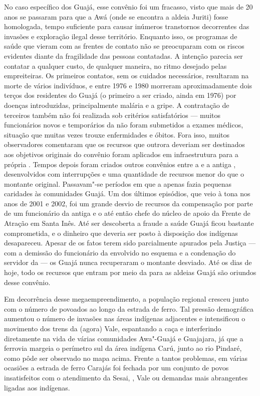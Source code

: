 No caso específico dos Guajá, esse convênio foi um fracasso, visto que
mais de 20 anos se passaram para que a  Awá (onde se encontra a aldeia
Juriti) fosse homologada, tempo suficiente para causar inúmeros
transtornos decorrentes das invasões e exploração ilegal desse
território. Enquanto isso, os programas de saúde que vieram com as
frentes de contato não se preocuparam com os riscos evidentes diante da
fragilidade das pessoas contatadas. A intenção parecia ser contatar a
qualquer custo, de qualquer maneira, no ritmo desejado pelas
empreiteiras. Os primeiros contatos, sem os cuidados necessários,
resultaram na morte de vários indivíduos, e entre 1976 e 1980 morreram
aproximadamente dois terços dos residentes do  Guajá (o primeiro a
ser criado, ainda em 1976) por doenças introduzidas, principalmente
malária e a gripe. A contratação de terceiros também não foi realizada
sob critérios satisfatórios --- muitos funcionários novos e temporários da
 não foram submetidos a exames médicos, situação que muitas vezes
trouxe enfermidades e óbitos. Fora isso, muitos observadores comentaram
que os recursos que outrora deveriam ser destinados aos objetivos
originais do convênio foram aplicados em infraestrutura para a própria
. Tempos depois foram criados outros convênios entre a  e a
antiga , desenvolvidos com interrupções e uma quantidade de recursos
menor do que o montante original. Passavam"-se períodos em que a 
apenas fazia pequenas caridades às comunidades Guajá. Um dos últimos
episódios, que veio à tona nos anos de 2001 e 2002, foi um grande desvio
de recursos da compensação por parte de um funcionário da antiga  e
o até então chefe do núcleo de apoio da Frente de Atração em Santa Inês.
Até ser descoberta a fraude a saúde Guajá ficou bastante comprometida, e
o dinheiro que deveria ser posto à disposição dos indígenas desapareceu.
Apesar de os fatos terem sido parcialmente apurados pela Justiça --- com a
demissão do funcionário da  envolvido no esquema e a condenação do
servidor da  --- os Guajá nunca recuperaram o montante desviado. Até
os dias de hoje, todo os recursos que entram por meio da  para as
aldeias Guajá são oriundos desse convênio.

Em decorrência desse megaempreendimento, a população regional cresceu
junto com o número de povoados ao longo da estrada de ferro. Tal pressão
demográfica aumentou o número de invasões nas áreas indígenas adjacentes
e intensificou o movimento dos trens da (agora) Vale, espantando a caça
e interferindo diretamente na vida de várias comunidades Awa"-Guajá e
Guajajara, já que a ferrovia margeia o perímetro sul da área indígena
Carú, junto ao rio Pindaré, como pôde ser observado no mapa acima.
Frente a tantos problemas, em várias ocasiões a estrada de ferro Carajás
foi fechada por um conjunto de povos insatisfeitos com o atendimento da
Sesai, , Vale ou demandas mais abrangentes ligadas aos indígenas.

